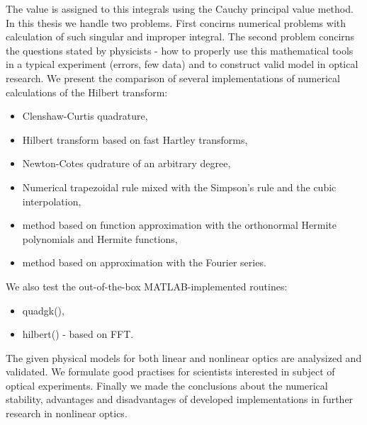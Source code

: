 \documentclass{article}
\begin{document}
The value is assigned to this integrals using the Cauchy principal value method. In this
thesis we handle two problems. First concirns numerical problems with
calculation of such singular and improper integral. The second problem
concirns the questions stated by physicists - how to properly use this
mathematical tools in a typical experiment (errors, few data) and to construct valid model in
optical research. We present the comparison of several implementations
of numerical calculations of the Hilbert transform:
\begin{itemize}
    \item Clenshaw-Curtis quadrature,
    \item Hilbert transform based on fast Hartley transforms,
    \item Newton-Cotes qudrature of an arbitrary degree,
    \item Numerical trapezoidal rule mixed with the Simpson's rule and the
cubic interpolation,
    \item method based on function approximation with the orthonormal Hermite
polynomials and Hermite functions,
	\item method based on approximation with the Fourier series.
\end{itemize}
We also test the out-of-the-box MATLAB-implemented routines:
\begin{itemize}
	\item quadgk(),
	\item hilbert() - based on FFT.
\end{itemize}
The given physical models for both linear and nonlinear optics are
analysized and validated. We formulate good practises for scientists
interested in subject of optical experiments. Finally we made the
conclusions about the numerical stability, advantages and
disadvantages of developed implementations in further research in
nonlinear optics.
\end{document}
